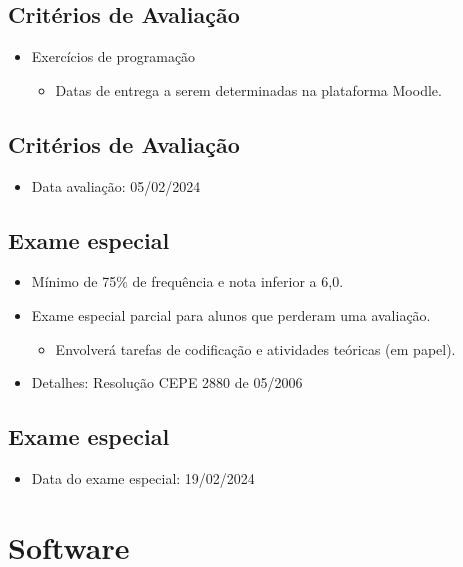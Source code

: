 \documentclass[11pt]{article}
\begin{document}
\subsection*{Critérios de Avaliação}
\label{sec:org1dc6f8e}

\begin{itemize}
\item Exercícios de programação
\begin{itemize}
\item Datas de entrega a serem determinadas na plataforma Moodle.
\end{itemize}
\end{itemize}
\subsection*{Critérios de Avaliação}
\label{sec:org832f3a5}

\begin{itemize}
\item Data avaliação: 05/02/2024
\end{itemize}
\subsection*{Exame especial}
\label{sec:orgc4a2fc7}

\begin{itemize}
\item Mínimo de 75\% de frequência e nota inferior a 6,0.

\item Exame especial parcial para alunos que perderam uma avaliação.

\begin{itemize}
\item Envolverá tarefas de codificação e atividades teóricas (em papel).
\end{itemize}

\item Detalhes: Resolução CEPE 2880 de 05/2006
\end{itemize}
\subsection*{Exame especial}
\label{sec:orgd551ee8}

\begin{itemize}
\item Data do exame especial: 19/02/2024
\end{itemize}
\section*{Software}
\label{sec:orgb17c7fb}
\end{document}

